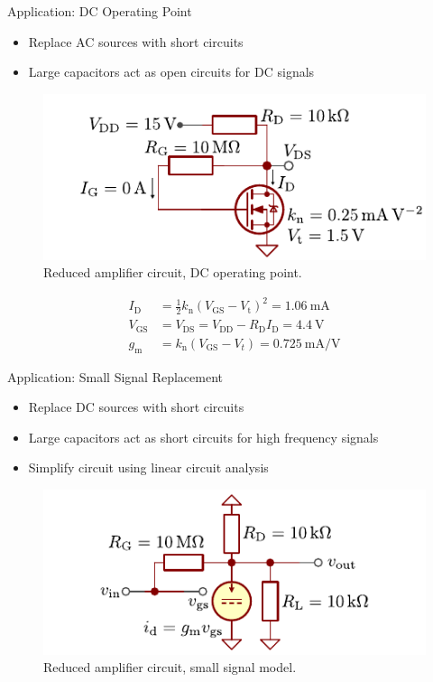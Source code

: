 \begin{frame}{Application: DC Operating Point}
    \begin{itemize}
        \item Replace AC sources with short circuits
        \item Large capacitors act as open circuits for DC signals
    \end{itemize}
    \begin{figure}
        \centering
        \includegraphics{../assets/example_circuit_dc.pdf}
        \caption{Reduced amplifier circuit, DC operating point.}
        \label{fig:mosfet_amplifier_dc}
    \end{figure}
    \begin{align*}
        I_{\mathrm{D}}&=\frac{1}{2}k_{\mathrm{n}}(V_{\mathrm{GS}}-V_{\mathrm{t}})^{2} 
        = \qty{1.06}{\milli \ampere}\\
        V_{\mathrm{GS}}&=V_{\mathrm{DS}}=V_{\mathrm{DD}}-R_{\mathrm{D}}I_{\mathrm{D}}
        =\qty{4.4}{\volt} \\
        g_\mathrm{m} &= k_\mathrm{n} (V_\mathrm{GS}-V_t) = \qty{0.725}{\milli \ampere \per \volt}
    \end{align*}
\end{frame}

\begin{frame}{Application: Small Signal Replacement}
    \begin{itemize}
        \item Replace DC sources with short circuits
        \item Large capacitors act as short circuits for high frequency signals
        \item Simplify circuit using linear circuit analysis
    \end{itemize}
    \begin{figure}
        \centering
        \includegraphics{../assets/mosfet_amplifier_small_signal.pdf}
        \caption{Reduced amplifier circuit, small signal model.}
        \label{fig:mosfet_amplifier_ac}
    \end{figure}
\end{frame}

